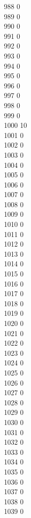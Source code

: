{ 988	0 \\
 989	0 \\
 990	0 \\
 991	0 \\
 992	0 \\
 993	0 \\
 994	0 \\
 995	0 \\
 996	0 \\
 997	0 \\
 998	0 \\
 999	0 \\
 1000	10 \\
 1001	0 \\
 1002	0 \\
 1003	0 \\
 1004	0 \\
 1005	0 \\
 1006	0 \\
 1007	0 \\
 1008	0 \\
 1009	0 \\
 1010	0 \\
 1011	0 \\
 1012	0 \\
 1013	0 \\
 1014	0 \\
 1015	0 \\
 1016	0 \\
 1017	0 \\
 1018	0 \\
 1019	0 \\
 1020	0 \\
 1021	0 \\
 1022	0 \\
 1023	0 \\
 1024	0 \\
 1025	0 \\
 1026	0 \\
 1027	0 \\
 1028	0 \\
 1029	0 \\
 1030	0 \\
 1031	0 \\
 1032	0 \\
 1033	0 \\
 1034	0 \\
 1035	0 \\
 1036	0 \\
 1037	0 \\
 1038	0 \\
 1039	0 \\
}
